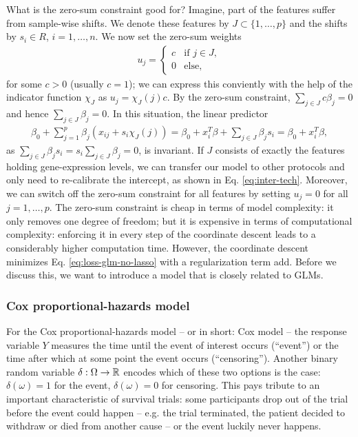 What is the zero-sum constraint good for? Imagine, part of the features suffer from sample-wise 
shifts. We denote these features by $J \subset \{1, \ldots, p\}$ and the shifts by $s_i \in R$, 
$i = 1, \ldots, n$. We now set the zero-sum weights  
\begin{align}
    u_j =
    \begin{cases}
        c & \text{if } j \in J, \\
        0 & \text{else},
    \end{cases}
\end{align}
for some $c > 0$ (usually $c = 1$); we can express this conviently with the help of the indicator 
function $\chi_J$ as $u_j = \chi_J(j) c$. By the zero-sum constraint, $\sum_{j \in J} c \beta_j = 0$  
and hence $\sum_{j \in J} \beta_j = 0$. In this situation, the linear predictor 
\begin{align}
    \beta_0 + \sum_{j=1}^p \beta_j (x_{ij} + s_i \chi_J(j))
    = \beta_0 + x_i^T \beta + \sum_{j \in J} \beta_j s_i = \beta_0 + x_i^T \beta,
\end{align}
as $\sum_{j \in J} \beta_j s_i = s_i \sum_{j \in J} \beta_j = 0$, is invariant. If $J$ consists of 
exactly the features holding gene-expression levels, we can transfer our model to other protocols 
and only need to re-calibrate the intercept, as shown in Eq. \eqref{eq:inter-tech}. Moreover, we 
can switch off the zero-sum constraint for all features by setting $u_j = 0$ for all 
$j = 1, \ldots, p$. The zero-sum constraint is cheap in terms of model complexity: it only removes 
one degree of freedom; but it is expensive in terms of computational complexity: enforcing it in
every step of the coordinate descent leads to a considerably higher computation time. However, the 
coordinate descent minimizes Eq. \eqref{eq:loss-glm-no-lasso} with a regularization term add. Before 
we discuss this, we want to introduce a model that is closely related to GLMs.

\subsubsection{Cox proportional-hazards model}\label{subsubsec:cox}

For the Cox proportional-hazards model -- or in short: Cox model -- the response variable $Y$ 
measures the time until the event of interest occurs (``event'') or the time after which at some 
point the 
event occurs (``censoring''). Another binary random variable $\delta: \Omega \to \mathbb{R}$ encodes 
which of these two options is the case: $\delta(\omega) = 1$ for the event, $\delta(\omega) = 0$ 
for censoring. This pays tribute to an important characteristic of survival trials: some
participants drop out of the trial before the event could happen -- e.g. the trial terminated, the 
patient decided to withdraw or died from another cause -- or the event luckily never happens.

